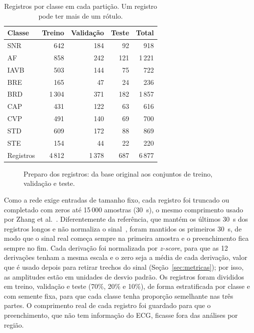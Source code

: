 \begin{table}[!t]\centering
\caption{Registros por classe em cada partição. Um registro pode ter mais de um rótulo.}\label{tab:classes}
\setlength{\tabcolsep}{4pt}
\begin{tabular}{lrrrr}
\toprule
\textbf{Classe} & \textbf{Treino} & \textbf{Validação} & \textbf{Teste} & \textbf{Total} \\
\midrule
SNR  & 642 & 184 & 92 & 918 \\
AF   & 858 & 242 & 121 & 1\,221 \\
IAVB & 503 & 144 & 75 & 722 \\
BRE  & 165 & 47 & 24 & 236 \\
BRD  & 1\,304 & 371 & 182 & 1\,857 \\
CAP  & 431 & 122 & 63 & 616 \\
CVP  & 491 & 140 & 69 & 700 \\
STD  & 609 & 172 & 88 & 869 \\
STE  & 154 & 44 & 22 & 220 \\
\midrule
Registros & 4\,812 & 1\,378 & 687 & 6\,877 \\
\bottomrule
\end{tabular}
\end{table}

\begin{figure}[!t]\centering

\caption{Preparo dos registros: da base original aos conjuntos de treino, validação e teste.}\label{fig:preproc}
\end{figure}

Como a rede exige entradas de tamanho fixo, cada registro foi truncado ou completado com zeros até 15\,000 amostras (30~s), o mesmo comprimento usado por Zhang et al.~\cite{zhang2021}. Diferentemente da referência, que mantém os últimos 30~s dos registros longos e não normaliza o sinal~\cite{zhang2021}, foram mantidos os primeiros 30~s, de modo que o sinal real começa sempre na primeira amostra e o preenchimento fica sempre no fim. Cada derivação foi normalizada por \textit{z-score}, para que as 12 derivações tenham a mesma escala e o zero seja a média de cada derivação, valor que é usado depois para retirar trechos do sinal (Seção~\ref{sec:metricas}); por isso, as amplitudes estão em unidades de desvio padrão. Os registros foram divididos em treino, validação e teste (70\%, 20\% e 10\%), de forma estratificada por classe e com semente fixa, para que cada classe tenha proporção semelhante nas três partes. O comprimento real de cada registro foi guardado para que o preenchimento, que não tem informação do ECG, ficasse fora das análises por região.

